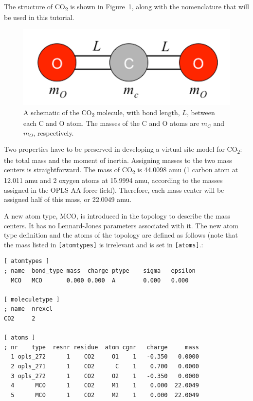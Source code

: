 \documentclass[9pt,tutorial]{livecoms}
\begin{document}
The structure of CO\textsubscript{2} is shown in Figure~\ref{vsites_triatomic_fig}, along with the nomenclature that will be used in this tutorial.

\begin{figure}[H]
\centering
\includegraphics{vsites_triatomic}
\caption{A schematic of the CO\textsubscript{2} molecule, with bond length, $L$, between each C and O atom. The masses of the C and O atoms are $m_C$ and $m_O$, respectively.}
\label{vsites_triatomic_fig}
\end{figure}

Two properties have to be preserved in developing a virtual site model for CO\textsubscript{2}: the total mass and the moment of inertia. Assigning masses to the two mass centers is straightforward. The mass of CO\textsubscript{2} is 44.0098 amu (1 carbon atom at 12.011 amu and 2 oxygen atoms at 15.9994 amu, according to the masses assigned in the OPLS-AA force field). Therefore, each mass center will be assigned half of this mass, or 22.0049 amu.

A new atom type, MCO, is introduced in the topology to describe the mass centers. It has no Lennard-Jones parameters associated with it. The new atom type definition and the atoms of the topology are defined as follows (note that the mass listed in \texttt{[atomtypes]} is irrelevant and is set in \texttt{[atoms]}.:

\begin{verbatim}
[ atomtypes ]
; name  bond_type mass  charge ptype    sigma   epsilon
  MCO   MCO       0.000 0.000  A        0.000   0.000

[ moleculetype ]
; name  nrexcl
CO2     2

[ atoms ]
; nr    type  resnr residue  atom cgnr   charge     mass
  1 opls_272      1    CO2     O1    1   -0.350   0.0000 
  2 opls_271      1    CO2      C    1    0.700   0.0000
  3 opls_272      1    CO2     O2    1   -0.350   0.0000
  4      MCO      1    CO2     M1    1    0.000  22.0049     
  5      MCO      1    CO2     M2    1    0.000  22.0049
\end{verbatim}
\end{document}
